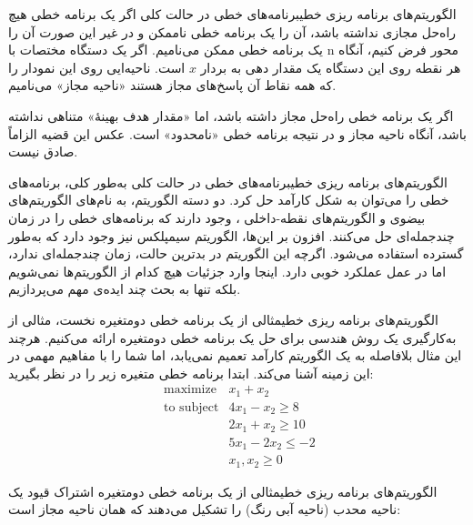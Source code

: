 \begin{itemframe-s}{الگوریتم‌های برنامه ریزی خطی}{برنامه‌های خطی در حالت کلی}
\itm
اگر یک برنامه خطی هیچ راه‌حل مجازی نداشته باشد، آن را یک برنامه خطی ناممکن
و در غیر این صورت آن را یک برنامه خطی ممکن
می‌نامیم.
\itm
اگر یک دستگاه مختصات با n محور فرض کنیم، آنگاه هر نقطه روی این دستگاه یک مقدار دهی به بردار $x$ است. ناحیه‌ایی روی این نمودار را که همه نقاط آن پاسخ‌های مجاز هستند «ناحیه مجاز»
می‌نامیم.

\itm
اگر یک برنامه خطی راه‌حل مجاز داشته باشد، اما «مقدار هدف بهینهٔ» متناهی نداشته باشد، آنگاه ناحیه مجاز و در نتیجه برنامه خطی «نامحدود»
است. عکس این قضیه الزاماً صادق نیست.
\end{itemframe-s}


\begin{itemframe-s}{الگوریتم‌های برنامه ریزی خطی}{برنامه‌های خطی در حالت کلی}
\itm
به‌طور کلی، برنامه‌های خطی را می‌توان به شکل کارآمد حل کرد.
دو دسته الگوریتم، به نام‌های الگوریتم‌های بیضوی
و الگوریتم‌های نقطه-داخلی
، وجود دارند که برنامه‌های خطی را در زمان چندجمله‌ای حل می‌کنند.
\itm
افزون بر این‌ها، الگوریتم سیمپلکس نیز وجود دارد که به‌طور گسترده استفاده می‌شود.
اگرچه این الگوریتم در بدترین حالت، زمان چندجمله‌ای ندارد، اما در عمل عملکرد خوبی دارد.
\itm
اینجا وارد جزئیات هیچ کدام از الگوریتم‌ها نمی‌شویم بلکه تنها به بحث چند ایده‌ی مهم می‌پردازیم.
\end{itemframe-s}


\begin{itemframe-s}{الگوریتم‌های برنامه ریزی خطی}{مثالی از یک برنامه خطی دو‌متغیره}
\itm
نخست، مثالی از به‌کارگیری یک روش هندسی برای حل یک برنامه خطی دو‌متغیره ارائه می‌کنیم. هرچند این مثال بلافاصله به یک الگوریتم کارآمد تعمیم نمی‌یابد، اما شما را با مفاهیم مهمی در این زمینه آشنا می‌کند.
\itm
ابتدا برنامه خطی متغیره زیر را در نظر بگیرید:
\begin{align*}
\text{ maximize} & x_1 + x_2\\
\text{ to subject} & 4x_1 - x_2 \geq 8 \\
& 2x_1 + x_2 \geq 10  \\
& 5x_1 - 2x_2 \leq -2 \\
& x_1, x_2 \geq 0
\end{align*}
\end{itemframe-s}


\begin{itemframe-s}{الگوریتم‌های برنامه ریزی خطی}{مثالی از یک برنامه خطی دو‌متغیره}
\itm
اشتراک قیود یک ناحیه محدب (ناحیه آبی رنگ) را تشکیل می‌دهند که همان ناحیه مجاز است:
\end{itemframe-s}



